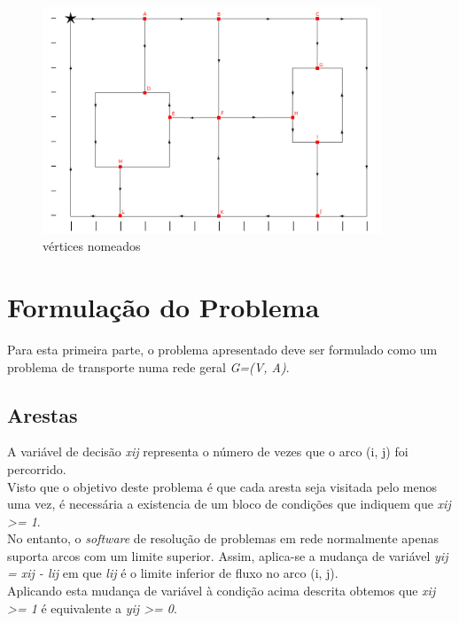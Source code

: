 \documentclass[a4paper]{report}
\begin{document}
\begin{figure}[H]
    \begin{center}
        \includegraphics[width=0.9\textwidth]{images/desafioLetras.png}\par
        \caption{vértices nomeados}
        \label{fig:named}
    \end{center}
\end{figure}

\pagebreak
\section{Formulação do Problema}
Para esta primeira parte, o problema apresentado deve ser formulado como um
problema de transporte numa rede geral \textit{G=(V, A)}.

\subsection{Arestas}
A variável de decisão \textit{xij} representa o número de vezes que o arco (i,
j) foi percorrido.\\
Visto que o objetivo deste problema é que cada aresta seja visitada pelo menos
uma vez, é necessária a existencia de um bloco de condições que indiquem que
\textit{xij >= 1}.\\
No entanto, o \textit{software} de resolução de problemas em rede normalmente
apenas suporta arcos com um limite superior. Assim, aplica-se a mudança de
variável \textit{yij = xij - lij} em que \textit{lij} é o limite inferior de
fluxo no arco (i, j).\\
Aplicando esta mudança de variável à condição acima descrita obtemos que
\textit{xij >= 1} é equivalente a \textit{yij >= 0}.
\end{document}
